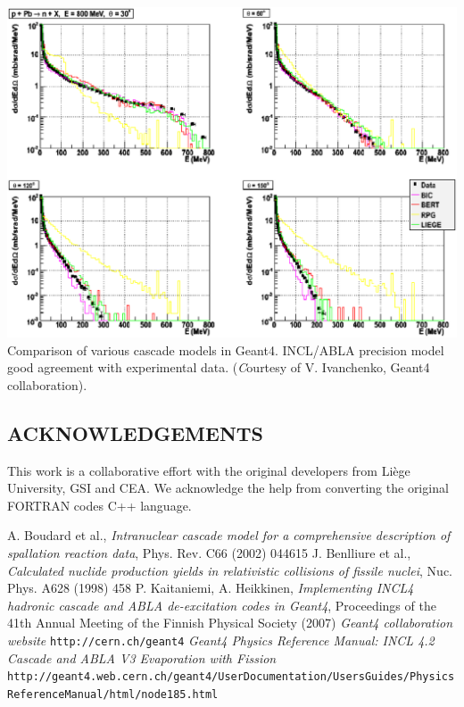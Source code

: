 \documentclass[20pt]{article}
\newenvironment{textbox}
{\begin{lrbox}{\dummybox}\begin{minipage}{0.9\columnwidth}}
{\end{minipage}\end{lrbox}\raisebox{-\depth}{\psshadowbox[framesep=1em,framearc=.1,shadow=true]{\usebox{\dummybox}}}\vspace{0.005\textheight}}
\begin{document}
\begin{center}
\begin{multicols}{3}
\includegraphics[scale=0.45]{images/vladimir.eps}
{\Large {\sf Comparison of various cascade models in Geant4. INCL/ABLA precision
model good agreement with experimental data. ({\emph Courtesy of
    V. Ivanchenko, Geant4 collaboration}).}}

\begin{textbox}


\section*{{\Huge {\sf ACKNOWLEDGEMENTS}}}

This work is a collaborative effort with the original developers from
Li\`ege University, GSI and CEA. We acknowledge the help from %
converting the original FORTRAN codes C++ language.

\end{textbox}
\vskip2cm
\begin{textbox}

{\large
{}
\begin{thebibliography}{9}
 A. Boudard et al., \emph{Intranuclear cascade model for
    a comprehensive description of spallation reaction data}, Phys.
  Rev. C66 (2002) 044615
 J. Benlliure et al., \emph{Calculated nuclide
    production yields in relativistic collisions of fissile nuclei},
  Nuc. Phys. A628 (1998) 458
 P. Kaitaniemi, A. Heikkinen, \emph{Implementing INCL4
    hadronic cascade and ABLA de-excitation codes in Geant4},
  Proceedings of the 41th Annual Meeting of the Finnish Physical
  Society (2007)
 \emph{Geant4 collaboration website} {\tt http://\-cern.ch/\-geant4}
 \emph{Geant4 Physics Reference Manual: INCL 4.2 Cascade and ABLA V3 Evaporation with Fission} {\tt http://geant4.web.cern.ch/\-geant4/\-UserDocumentation/\-UsersGuides/\-PhysicsReferenceManual/\-html/\-node185.html}
%
%
\end{thebibliography}
}


\end{textbox}
\end{multicols}
\end{center}
\end{document}
